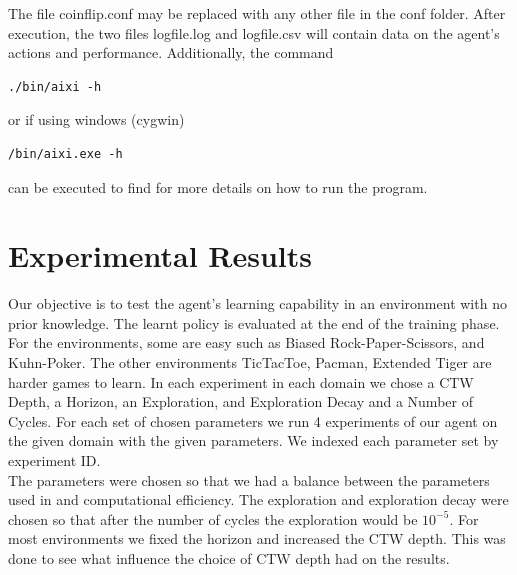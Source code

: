 \documentclass{article}
\theoremstyle{definition}
\newtheorem{primary statistics}[definition]{Primary Statistics}
\newtheorem{auxiliary statistics}[definition]{Auxiliary Statistics}
\begin{document}
The file coinflip.conf may be replaced with any other file in the conf folder. 
After execution, the two files logfile.log and logfile.csv will contain data on the agent’s actions and performance. Additionally, the command
\begin{lstlisting}[style=DOS]
./bin/aixi -h
\end{lstlisting}
or if using windows (cygwin)
\begin{lstlisting}[style=DOS]
/bin/aixi.exe -h
\end{lstlisting}
can be executed to find for more details on how to run the program.




\section{Experimental Results}

Our objective is to test the agent's learning capability in an environment with no prior knowledge. The learnt policy is evaluated at the end of the training phase. For the environments, some are easy such as Biased Rock-Paper-Scissors, and Kuhn-Poker. The other environments TicTacToe, Pacman, Extended Tiger are harder games to learn. In each experiment in each domain we chose a CTW Depth, a Horizon, an Exploration, and Exploration Decay and a Number of Cycles. For each set of chosen parameters we run 4 experiments of our agent on the given domain with the given parameters. We indexed each parameter set by experiment ID. \\

The parameters were chosen so that we had a balance between the parameters used in \citep{veness2011monte} and computational efficiency. The exploration and exploration decay were chosen so that after the number of cycles the exploration would be $10^{-5}$. For most environments we fixed the horizon and increased the CTW depth. This was done to see what influence the choice of CTW depth had on the results. \\
\end{document}
